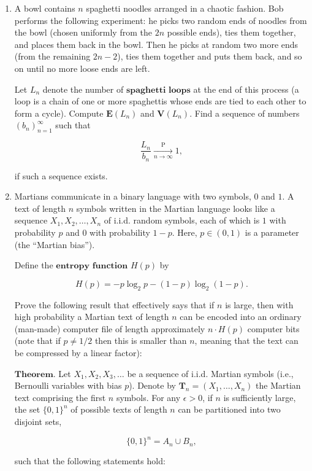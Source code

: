 \documentclass[11pt]{report}
\theoremstyle{plain}
\theoremstyle{definition}
\begin{document}
\begin{enumerate}[label=\arabic*.]
$\textbf{Hint.}$ Interpret the left-hand side as an expected value; use the laws of large numbers.
\item A bowl contains $n$ spaghetti noodles arranged in a chaotic fashion. Bob performs the following experiment: he picks two random ends of noodles from the bowl (chosen uniformly from the $2n$ possible ends), ties them together, and places them back in the bowl. Then he picks at random two more ends (from the remaining $2n-2$), ties them together and puts them back, and so on until no more loose ends are left.

Let $L_n$ denote the number of $\textbf{spaghetti loops}$ at the end of this process (a loop is a chain of one or more spaghettis whose ends are tied to each other to form a cycle). Compute $\mathbf{E}(L_n)$ and $\mathbf{V}(L_n)$. Find a sequence of numbers $(b_n)_{n=1}^\infty$ such that

\[
\frac{L_n}{b_n} \xrightarrow[n\to\infty]{\mathrm{P}} 1,
\]

if such a sequence exists.
\item Martians communicate in a binary language with two symbols, $0$ and $1$. A text of length $n$ symbols written in the Martian language looks like a sequence $X_1, X_2, \ldots, X_n$ of i.i.d. random symbols, each of which is $1$ with probability $p$ and $0$ with probability $1-p$. Here, $p\in(0,1)$ is a parameter (the ``Martian bias'').

Define the $\textbf{entropy function}$ $H(p)$ by

\[
H(p) = -p\log_2 p -(1-p)\log_2 (1-p).
\]

Prove the following result that effectively says that if $n$ is large, then with high probability a Martian text of length $n$ can be encoded into an ordinary (man-made) computer file of length approximately $n\cdot H(p)$ computer bits (note that if $p\neq 1/2$ then this is smaller than $n$, meaning that the text can be compressed by a linear factor):

$\textbf{Theorem.}$ Let $X_1, X_2, X_3, \ldots$ be a sequence of i.i.d. Martian symbols (i.e., Bernoulli variables with bias $p$). Denote by $\mathbf{T}_n=(X_1,\ldots,X_n)$ the Martian text comprising the first $n$ symbols.
For any $\epsilon>0$, if $n$ is sufficiently large, the set $\{0,1\}^n$ of possible texts of length $n$ can be partitioned into two disjoint sets,

\[
\{0,1\}^n = A_n \cup B_n,
\]

such that the following statements hold:


\end{enumerate}
\end{document}
